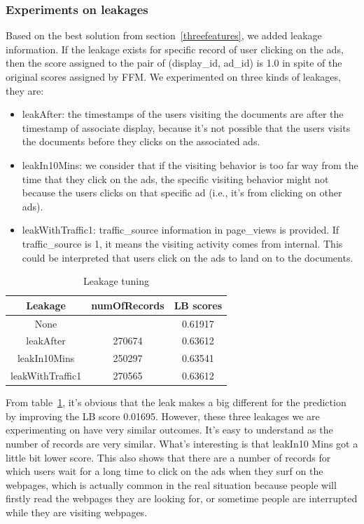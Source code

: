 \documentclass[fleqn,10pt]{SelfArx} %
\begin{document}
\subsubsection{Experiments on leakages}\label{leakageexperiments}
Based on the best solution from section~\ref{threefeatures}, we added leakage information. If the leakage exists for specific record of user clicking on the ads, then the score assigned to the pair of (display\_id, ad\_id) is 1.0 in spite of the original scores assigned by FFM. We experimented on three kinds of leakages, they are:
\begin{itemize}
\item leakAfter: the timestamps of the users visiting the documents are after the timestamp of associate display, because it's not possible that the users visits the documents before they clicks on the associated ads. 
\item leakIn10Mins: we consider that if the visiting behavior is too far way from the time that they click on the ads, the specific visiting behavior might not because the users clicks on that specific ad (i.e., it's from clicking on other ads).
\item leakWithTraffic1:  traffic\_source information in page\_views is provided. If traffic\_source is 1, it means the visiting activity comes from internal. This could be interpreted that users click on the ads to land on to the documents. 
\end{itemize}
\begin{table}[!htbp]
\begin{center}
 \begin{tabular}{ c|c|c }\hline\hline 
Leakage  & numOfRecords   &  LB scores \\ \hline \hline
None  &  & 0.61917 \\
leakAfter  &  270674 &  0.63612   \\
leakIn10Mins &  250297  &  0.63541  \\
leakWithTraffic1 & 270565   &  0.63612  \\ \hline \hline
\end{tabular}
\end{center}
\caption{Leakage tuning}\label{tab:leakagetuning}
\end{table}
From table~\ref{tab:leakagetuning}, it's obvious that the leak makes a big different for the prediction by improving the LB score 0.01695. However, these three leakages we are experimenting on have very similar outcomes. It's easy to understand as the number of records are very similar. What's interesting is that leakIn10 Mins got a little bit lower score. This also shows that there are a number of records for which users wait for a long time to click on the ads when they surf on the webpages, which is actually common in the real situation because people will firstly read the webpages they are looking for, or sometime people are interrupted while they are visiting webpages.
\end{document}
